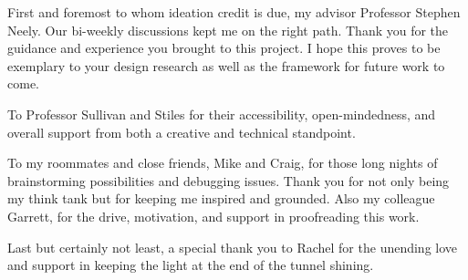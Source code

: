 
\setlength{\parskip}{1em}
\setlength{\parindent}{0em}

\noindent
First and foremost to whom ideation credit is due, my advisor Professor Stephen Neely. Our bi-weekly discussions kept me on the right path. Thank you for the guidance and experience you brought to this project. I hope this proves to be exemplary to your design research as well as the framework for future work to come.

To Professor Sullivan and Stiles for their accessibility, open-mindedness, and overall support from both a creative and technical standpoint.

To my roommates and close friends, Mike and Craig, for those long nights of brainstorming possibilities and debugging issues. Thank you for not only being my think tank but for keeping me inspired and grounded. Also my colleague Garrett, for the drive, motivation, and support in proofreading this work.

Last but certainly not least, a special thank you to Rachel for the unending love and support in keeping the light at the end of the tunnel shining.